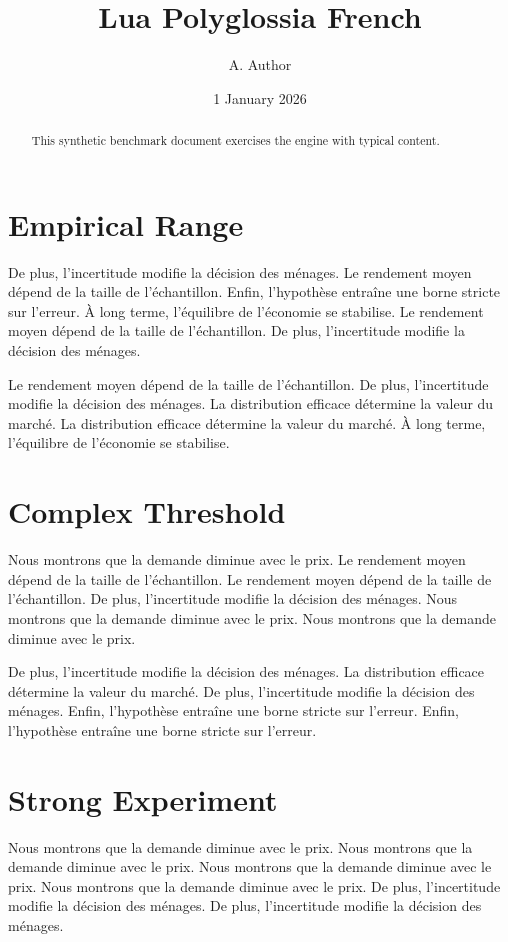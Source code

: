 \documentclass[11pt]{article}
\title{Lua Polyglossia French}
\author{A. Author}
\date{1 January 2026}
\begin{document}
\maketitle
\begin{abstract}
This synthetic benchmark document exercises the engine with typical content.
\end{abstract}
\tableofcontents
\section{Empirical Range}\label{sec:1}

De plus, l'incertitude modifie la décision des ménages. Le rendement moyen dépend de la taille de l'échantillon. Enfin, l'hypothèse entraîne une borne stricte sur l'erreur. À long terme, l'équilibre de l'économie se stabilise. Le rendement moyen dépend de la taille de l'échantillon. De plus, l'incertitude modifie la décision des ménages.

Le rendement moyen dépend de la taille de l'échantillon. De plus, l'incertitude modifie la décision des ménages. La distribution efficace détermine la valeur du marché. La distribution efficace détermine la valeur du marché. À long terme, l'équilibre de l'économie se stabilise.

\section{Complex Threshold}\label{sec:2}

Nous montrons que la demande diminue avec le prix. Le rendement moyen dépend de la taille de l'échantillon. Le rendement moyen dépend de la taille de l'échantillon. De plus, l'incertitude modifie la décision des ménages. Nous montrons que la demande diminue avec le prix. Nous montrons que la demande diminue avec le prix.

De plus, l'incertitude modifie la décision des ménages. La distribution efficace détermine la valeur du marché. De plus, l'incertitude modifie la décision des ménages. Enfin, l'hypothèse entraîne une borne stricte sur l'erreur. Enfin, l'hypothèse entraîne une borne stricte sur l'erreur.

\section{Strong Experiment}\label{sec:3}

Nous montrons que la demande diminue avec le prix. Nous montrons que la demande diminue avec le prix. Nous montrons que la demande diminue avec le prix. Nous montrons que la demande diminue avec le prix. De plus, l'incertitude modifie la décision des ménages. De plus, l'incertitude modifie la décision des ménages.
\end{document}

